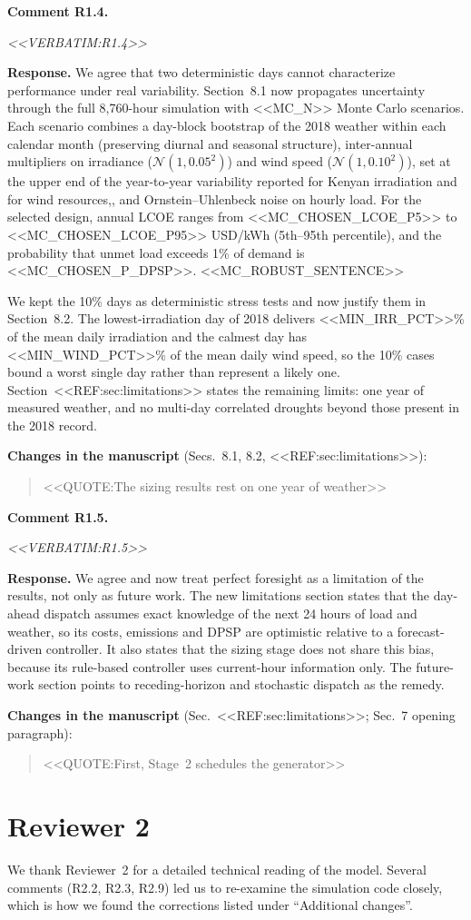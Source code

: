 \documentclass[11pt]{article}
\newcounter{rc}
\newcommand{\reviewer}[1]{\section*{Reviewer #1}\setcounter{rc}{0}}
\newcommand{\rcomment}[2]{\stepcounter{rc}\par\medskip
  \noindent\textbf{Comment #1.}\par
  {\color{commentgrey}\itshape #2\par}}
\newcommand{\response}[1]{\par\noindent\textbf{Response.} #1\par}
\newcommand{\change}[2]{\par\noindent\textbf{Changes in the manuscript} (#1):\par
  \begin{quote}\color{revblue}#2\end{quote}}
\begin{document}
\rcomment{R1.4}{<<VERBATIM:R1.4>>}
\response{We agree that two deterministic days cannot characterize performance under real variability. Section~8.1 now propagates uncertainty through the full 8,760-hour simulation with <<MC_N>> Monte Carlo scenarios. Each scenario combines a day-block bootstrap of the 2018 weather within each calendar month (preserving diurnal and seasonal structure), inter-annual multipliers on irradiance ($\mathcal{N}(1,0.05^2)$) and wind speed ($\mathcal{N}(1,0.10^2)$), set at the upper end of the year-to-year variability reported for Kenyan irradiation and for wind resources,, and Ornstein--Uhlenbeck noise on hourly load. For the selected design, annual LCOE ranges from <<MC_CHOSEN_LCOE_P5>> to <<MC_CHOSEN_LCOE_P95>> USD/kWh (5th--95th percentile), and the probability that unmet load exceeds 1\% of demand is <<MC_CHOSEN_P_DPSP>>. <<MC_ROBUST_SENTENCE>>

We kept the 10\% days as deterministic stress tests and now justify them in Section~8.2. The lowest-irradiation day of 2018 delivers <<MIN_IRR_PCT>>\% of the mean daily irradiation and the calmest day has <<MIN_WIND_PCT>>\% of the mean daily wind speed, so the 10\% cases bound a worst single day rather than represent a likely one. Section~<<REF:sec:limitations>> states the remaining limits: one year of measured weather, and no multi-day correlated droughts beyond those present in the 2018 record.}
\change{Secs.~8.1, 8.2, <<REF:sec:limitations>>}{<<QUOTE:The sizing results rest on one year of weather>>}

\rcomment{R1.5}{<<VERBATIM:R1.5>>}
\response{We agree and now treat perfect foresight as a limitation of the results, not only as future work. The new limitations section states that the day-ahead dispatch assumes exact knowledge of the next 24 hours of load and weather, so its costs, emissions and DPSP are optimistic relative to a forecast-driven controller. It also states that the sizing stage does not share this bias, because its rule-based controller uses current-hour information only. The future-work section points to receding-horizon and stochastic dispatch as the remedy.}
\change{Sec.~<<REF:sec:limitations>>; Sec.~7 opening paragraph}{<<QUOTE:First, Stage~2 schedules the generator>>}

\reviewer{2}
We thank Reviewer~2 for a detailed technical reading of the model. Several comments (R2.2, R2.3, R2.9) led us to re-examine the simulation code closely, which is how we found the corrections listed under ``Additional changes''.
\end{document}
